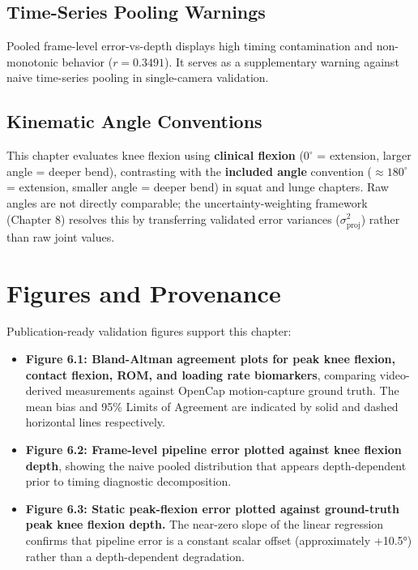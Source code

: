 \subsection{Time-Series Pooling Warnings}
\label{sec:6-6-3-time-series-pooling-warnings}

Pooled frame-level error-vs-depth displays high timing contamination and non-monotonic behavior ($r = 0.3491$). It serves as a supplementary warning against naive time-series pooling in single-camera validation.

\subsection{Kinematic Angle Conventions}
\label{sec:6-6-4-kinematic-angle-conventions}

This chapter evaluates knee flexion using \textbf{clinical flexion} ($0^\circ$ = extension, larger angle = deeper bend), contrasting with the \textbf{included angle} convention ($\approx 180^\circ$ = extension, smaller angle = deeper bend) in squat and lunge chapters. Raw angles are not directly comparable; the uncertainty-weighting framework (Chapter 8) resolves this by transferring validated error variances ($\sigma^2_{\text{proj}}$) rather than raw joint values.



\section{Figures and Provenance}
\label{sec:6-7-figures-and-provenance}


Publication-ready validation figures support this chapter:
\begin{itemize}
  \item \textbf{Figure 6.1: Bland-Altman agreement plots for peak knee flexion, contact flexion, ROM, and loading rate biomarkers}, comparing video-derived measurements against OpenCap motion-capture ground truth. The mean bias and 95\% Limits of Agreement are indicated by solid and dashed horizontal lines respectively.
  \item \textbf{Figure 6.2: Frame-level pipeline error plotted against knee flexion depth}, showing the naive pooled distribution that appears depth-dependent prior to timing diagnostic decomposition.
  \item \textbf{Figure 6.3: Static peak-flexion error plotted against ground-truth peak knee flexion depth.} The near-zero slope of the linear regression confirms that pipeline error is a constant scalar offset (approximately +10.5°) rather than a depth-dependent degradation.
\end{itemize}